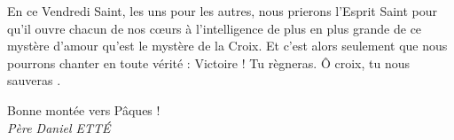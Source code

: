 En ce Vendredi Saint, les uns pour les autres,
nous prierons
l’Esprit Saint pour qu’il ouvre chacun de nos cœurs à l’intelligence de plus en plus grande de ce mystère d’amour qu’est le mystère de la Croix. Et c’est alors seulement que nous pourrons chanter en toute vérité : \og Victoire ! Tu règneras. Ô croix, tu nous sauveras \fg.



\begin{flushright}
Bonne montée vers Pâques !\\
\textit{Père  Daniel  ETTÉ}
\end{flushright}
